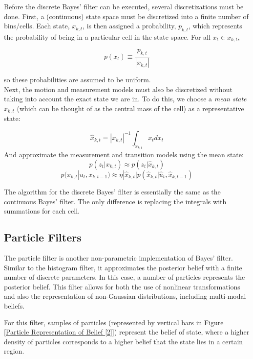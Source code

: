 \documentclass[twoside]{article}
\begin{document}
Before the discrete Bayes' filter can be executed, several discretizations must be done. First, a (continuous) state space must be discretized into a finite number of bins/cells. Each state, $x_{k,t}$, is then assigned a probability, $p_{k,t}$, which represents the probability of being in a particular cell in the state space. For all $x_t \in x_{k,t}$,

\begin{equation}
    p(x_t) \equiv \frac{p_{k,t}}{|x_{k,t}|} 
\end{equation}

so these probabilities are assumed to be uniform. \\
Next, the motion and measurement models must also be discretized without taking into account the exact state we are in. To do this, we choose a \textit{mean state} $\hat{x}_{k,t}$ (which can be thought of as the central mass of the cell) as a representative state:

\begin{equation}
    \hat{x}_{k,t} = |x_{k,t}|^{-1}\int_{x_{k,t}} x_tdx_t
\end{equation}
And approximate the measurement and transition models using the mean state:
\begin{equation}
    p(z_t|x_{k,t})\approx p(z_t|\hat{x}_{k,t})
\end{equation}
\begin{equation}
    p(x_{k,t}|u_t, x_{k,t-1})\approx \eta |\hat{x}_{k,t}|p(\hat{x}_{k,t}|\hat{u}_t,\hat{x}_{k,t-1})
\end{equation}

The algorithm for the discrete Bayes' filter is essentially the same as the continuous Bayes' filter. The only difference is replacing the integrals with summations for each cell.

\subsection{Particle Filters}

The particle filter is another non-parametric implementation of Bayes' filter. Similar to the histogram filter, it approximates the posterior belief with a finite number of discrete parameters. In this case, a number of particles represents the posterior belief. This filter allows for both the use of nonlinear transformations and also the representation of non-Gaussian distributions, including multi-modal beliefs. 


For this filter, samples of particles (represented by vertical bars in Figure \ref{Particle Representation of Belief [2]}) represent the belief of state, where a higher density of particles corresponds to a higher belief that the state lies in a certain region. 
\end{document}
